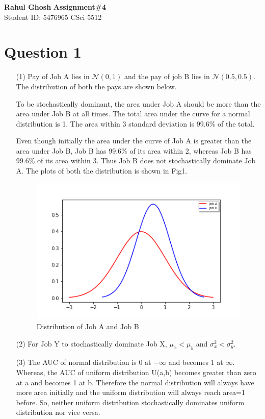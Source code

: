 \documentclass[letter, 10pt]{article}
\begin{document}
\noindent
\large \textbf{Rahul Ghosh} \hfill \textbf{Assignment\#4}\\
\normalsize Student ID: 5476965 \hfill CSci 5512\\

\section*{Question 1}
\begin{itemize}
    \item[(1)] Pay of Job A lies in $\mathcal{N}(0,1)$ and the pay of job B lies in $\mathcal{N}(0.5,0.5)$. The distribution of both the pays are shown below.

    To be stochastically dominant, the area under Job A should be more than the area under Job B at all times. The total area under the curve for a normal distribution is 1. The area within 3 standard deviation is 99.6\% of the total.
    
    Even though initially the area under the curve of Job A is greater than the area under Job B, Job B has 99.6\% of its area within 2, whereas Job B has 99.6\% of its area within 3. Thus Job B does not stochastically dominate Job A. The plots of both the distribution is shown in Fig1.
    
    \begin{figure}[H]
        \centering
        \includegraphics[width=\textwidth, height=0.5\textwidth]{HW4/P1.png}
        \caption{Distribution of Job A and Job B}
    \end{figure}
    
    \item[(2)] For Job Y to stochastically dominate Job X, $\mu_x<\mu_y$ and $\sigma^2_x<\sigma^2_y$.
    
    \item[(3)] The AUC of normal distribution is 0 at $-\infty$ and becomes 1 at $\infty$. Whereas, the AUC of uniform distribution U(a,b) becomes greater than zero at a and becomes 1 at b. Therefore the normal distribution will always have more area initially and the uniform distribution will always reach area=1 before. So, neither uniform distribution stochastically dominates uniform distribution nor vice versa.
\end{itemize}
\end{document}
